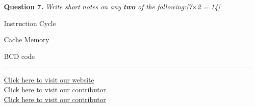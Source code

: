 \documentclass[11pt,a4paper]{article}
\newcommand{\pts}[1]{\hfill   \textit{[#1]}}
\begin{document}
\bigskip




\noindent   \textbf{Question 7.}   \textit{Write short notes on any   \textbf{two} of the following:}\pts{7$ \times$2 = 14}

\begin{parts}
  \item Instruction Cycle
  \item Cache Memory
  \item BCD code
\end{parts}

\vfill
\rule{\linewidth}{0.4pt}

\begin{center}\small
  \href{https://bhu-exam.vercel.app/}{Click here to visit our website}\\[4pt]
  \href{https://me-aryan.vercel.app/}{Click here to visit our contributor}\\[4pt]
  \href{https://quashan-me.vercel.app/}{Click here to visit our contributor}
\end{center}
\end{document}
